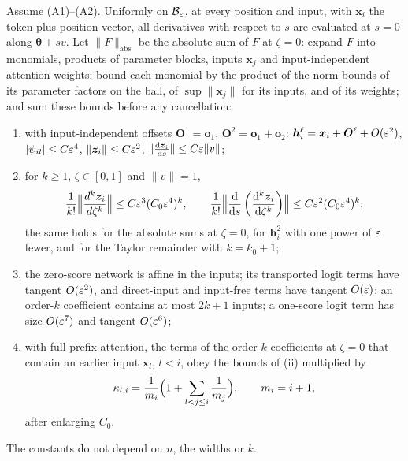 \begin{proposition}
\label{prop:network}
Assume (A1)--(A2). Uniformly on $\mathcal B_{\varepsilon}$, at every position and input, with $\bm x_i$ the token-plus-position vector,
all derivatives with respect to $s$ are evaluated at $s=0$ along $\bm\theta+sv$.
Let $\|F\|_{\mathrm{abs}}$ be the absolute sum of $F$ at $\zeta=0$: expand $F$ into monomials, products of
parameter blocks, inputs $\bm x_j$ and input-independent attention weights; bound each monomial by the product of the norm bounds of its
parameter factors on the ball, of $\sup\|\bm x_j\|$ for its inputs, and of its weights; and sum these bounds before any cancellation:
\begin{enumerate}[label=(\roman*),leftmargin=*,itemsep=3pt,topsep=4pt]
\item with input-independent offsets $\bm O^1=\bm o_1$, $\bm O^2=\bm o_1+\bm o_2$: $\bm h_i^\ell=\bm x_i+\bm O^\ell+O(\varepsilon^2)$, $|\psi_{il}|\le C\varepsilon^4$,
$\|\bm z_i\|\le C\varepsilon^2$, $\|\dd{\bm z_i}{s}\|\le C\initscale\|v\|$;
\item for $k\ge1$, $\zeta\in[0,1]$ and $\|v\|=1$,
\[
 \frac{1}{k!}\Bigl\|\frac{d^k\bm z_i}{d\zeta^k}\Bigr\|\le C\initscale^3(C_0\initscale^4)^k,\qquad
 \frac{1}{k!}\Bigl\|\dd{}{s}\left(\frac{\mathrm d^k\bm z_i}{\mathrm d\zeta^k}\right)\Bigr\|\le C\initscale^2(C_0\initscale^4)^k;
\]
the same holds for the absolute sums at $\zeta=0$, for $\bm h^2_i$ with one power of $\varepsilon$ fewer, and for the Taylor remainder with $k=k_0+1$;
\item the zero-score network is affine in the inputs; its transported logit terms have tangent $O(\varepsilon^2)$, and direct-input and
input-free terms have tangent $O(\varepsilon)$; an order-$k$ coefficient contains at most $2k+1$ inputs; a one-score logit term has size
$O(\varepsilon^7)$ and tangent $O(\varepsilon^6)$;
\item with full-prefix attention, the terms of the order-$k$ coefficients at $\zeta=0$ that contain an earlier input $\bm x_l$, $l<i$, obey the
bounds of (ii) multiplied by
\begin{equation}
 \kappa_{l,i}=\frac{1}{m_i}\Bigl(1+\sum_{l<j\le i}\frac{1}{m_j}\Bigr),\qquad m_i=i+1,
 \label{eq:dilution}
\end{equation}
after enlarging $C_0$.
\end{enumerate}
The constants do not depend on $n$, the widths or $k$.
\end{proposition}

